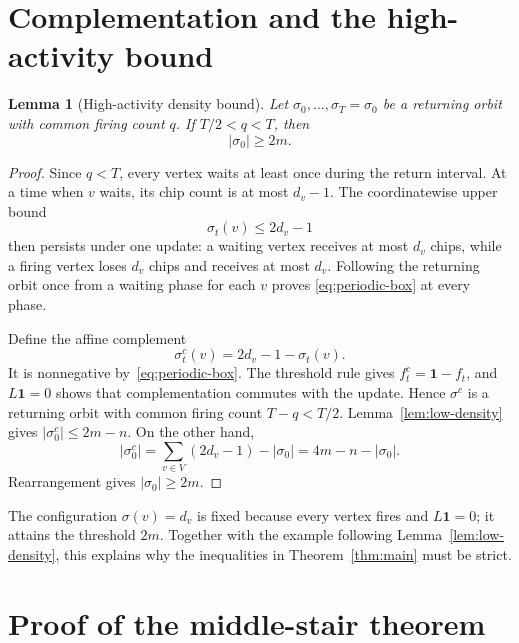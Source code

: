 \documentclass[11pt]{article}
\newtheorem{lemma}[theorem]{Lemma}
\theoremstyle{definition}
\theoremstyle{remark}
\newcommand{\one}{\mathbf{1}}
\newcommand{\chips}[1]{\lvert #1\rvert}
\begin{document}
\section{Complementation and the high-activity bound}

\begin{lemma}[High-activity density bound]\label{lem:high-density}
Let $\sigma_0,\ldots,\sigma_T=\sigma_0$ be a returning orbit with common
firing count $q$. If $T/2<q<T$, then
\[
   \chips{\sigma_0}\ge 2m.
\]
\end{lemma}

\begin{proof}
Since $q<T$, every vertex waits at least once during the return interval. At
a time when $v$ waits, its chip count is at most $d_v-1$. The coordinatewise
upper bound
\begin{equation}\label{eq:periodic-box}
   \sigma_t(v)\le 2d_v-1
\end{equation}
then persists under one update: a waiting vertex receives at most $d_v$
chips, while a firing vertex loses $d_v$ chips and receives at most $d_v$.
Following the returning orbit once from a waiting phase for each $v$ proves
\eqref{eq:periodic-box} at every phase.

Define the affine complement
\[
   \sigma_t^c(v)=2d_v-1-\sigma_t(v).
\]
It is nonnegative by~\eqref{eq:periodic-box}. The threshold rule gives
$f_t^c=\one-f_t$, and $L\one=0$ shows that complementation commutes with the
update. Hence $\sigma^c$ is a returning orbit with common firing count
$T-q<T/2$. Lemma~\ref{lem:low-density} gives
$\chips{\sigma_0^c}\le 2m-n$. On the other hand,
\[
   \chips{\sigma_0^c}
   =\sum_{v\in V}(2d_v-1)-\chips{\sigma_0}
   =4m-n-\chips{\sigma_0}.
\]
Rearrangement gives $\chips{\sigma_0}\ge 2m$.
\end{proof}

The configuration $\sigma(v)=d_v$ is fixed because every vertex fires and
$L\one=0$; it attains the threshold $2m$. Together with the example following
Lemma~\ref{lem:low-density}, this explains why the inequalities in
Theorem~\ref{thm:main} must be strict.

\section{Proof of the middle-stair theorem}
\end{document}
